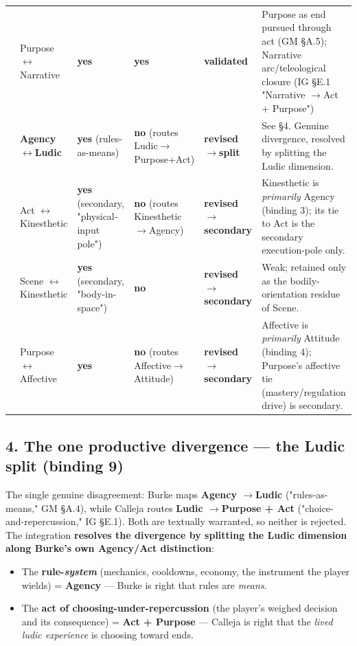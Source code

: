 \documentclass[11pt]{report}
\begin{document}
\begin{table}[H]
\begin{tabularx}{\textwidth}{>{\RaggedRight\arraybackslash}X>{\RaggedRight\arraybackslash}X>{\RaggedRight\arraybackslash}X>{\RaggedRight\arraybackslash}X>{\RaggedRight\arraybackslash}X>{\RaggedRight\arraybackslash}X}
8 & Purpose $\leftrightarrow$\allowbreak  Narrative & \textbf{yes} & \textbf{yes} & \textbf{validated} & Purpose as end pursued through act (GM §A.5); Narrative arc/teleological closure (IG §E.1 "Narrative $\rightarrow$\allowbreak  Act + Purpose") \\
9 & \textbf{Agency $\leftrightarrow$\allowbreak  Ludic} & \textbf{yes} (rules-as-means) & \textbf{no} (routes Ludic$\rightarrow$\allowbreak Purpose+Act) & \textbf{revised $\rightarrow$\allowbreak  split} & See §4. Genuine divergence, resolved by splitting the Ludic dimension. \\
10 & Act $\leftrightarrow$\allowbreak  Kinesthetic & \textbf{yes} (secondary, "physical-input pole") & \textbf{no} (routes Kinesthetic$\rightarrow$\allowbreak Agency) & \textbf{revised $\rightarrow$\allowbreak  secondary} & Kinesthetic is \textit{primarily} Agency (binding 3); its tie to Act is the secondary execution-pole only. \\
11 & Scene $\leftrightarrow$\allowbreak  Kinesthetic & \textbf{yes} (secondary, "body-in-space") & \textbf{no} & \textbf{revised $\rightarrow$\allowbreak  secondary} & Weak; retained only as the bodily-orientation residue of Scene. \\
12 & Purpose $\leftrightarrow$\allowbreak  Affective & \textbf{yes} & \textbf{no} (routes Affective$\rightarrow$\allowbreak Attitude) & \textbf{revised $\rightarrow$\allowbreak  secondary} & Affective is \textit{primarily} Attitude (binding 4); Purpose's affective tie (mastery/regulation drive) is secondary. \\
\bottomrule
\end{tabularx}
\end{table}


\subsection{4. The one productive divergence — the Ludic split (binding 9)}


The single genuine disagreement: Burke maps \textbf{Agency $\rightarrow$\allowbreak  Ludic} ("rules-as-means," GM §A.4), while Calleja routes \textbf{Ludic $\rightarrow$\allowbreak  Purpose + Act} ("choice-and-repercussion," IG §E.1). Both are textually warranted, so neither is rejected. The integration \textbf{resolves the divergence by splitting the Ludic dimension along Burke's own Agency/Act distinction}:


\begin{itemize}
\item The \textbf{rule-\textit{system}} (mechanics, cooldowns, economy, the instrument the player wields) = \textbf{Agency} — Burke is right that rules are \textit{means}.
\item The \textbf{act of choosing-under-repercussion} (the player's weighed decision and its consequence) = \textbf{Act + Purpose} — Calleja is right that the \textit{lived ludic experience} is choosing toward ends.
\end{itemize}
\end{document}
